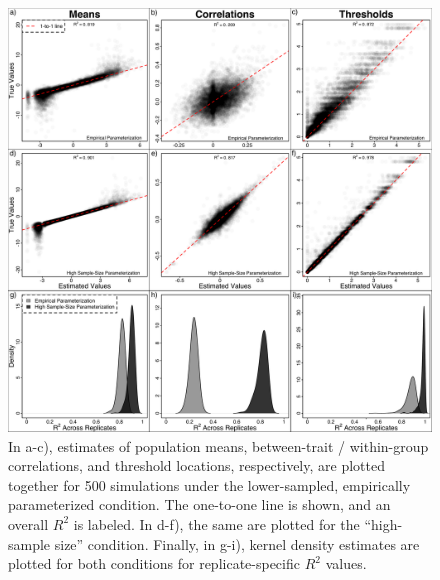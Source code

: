 \documentclass[10pt, twocolumn, twoside]{article}
\begin{document}
\begin{figure}[h]
\centering
\includegraphics[width=160mm]{figures/chpt4_figure6.pdf}
\caption[Optimization Output for TSAR-MBOP Simulation Study]{In a-c), estimates of population means, between-trait / within-group correlations, and threshold locations, respectively, are plotted together for 500 simulations under the lower-sampled, empirically parameterized condition. The one-to-one line is shown, and an overall $R^2$ is labeled. In d-f), the same are plotted for the ``high-sample size'' condition. Finally, in g-i), kernel density estimates are plotted for both conditions for replicate-specific $R^2$ values.  \label{overflow}
\label{fig:simsOptimResults}
}
\end{figure}
\end{document}
